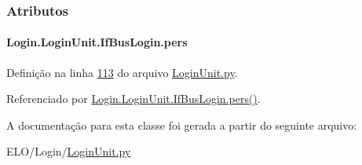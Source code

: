 \subsubsection{Atributos}
\hypertarget{classLogin_1_1LoginUnit_1_1IfBusLogin_a53b8075436052b94282021c84a2c3211}{
\paragraph[{pers}]{\setlength{\rightskip}{0pt plus 5cm}Login.\-Login\-Unit.\-If\-Bus\-Login.\-pers}}\label{classLogin_1_1LoginUnit_1_1IfBusLogin_a53b8075436052b94282021c84a2c3211}


Definição na linha \hyperlink{LoginUnit_8py_source_l00113}{113} do arquivo \hyperlink{LoginUnit_8py_source}{Login\-Unit.\-py}.



Referenciado por \hyperlink{classLogin_1_1LoginUnit_1_1IfBusLogin_a807b0a5d5bdae58087feb9d810a6538d}{Login.\-Login\-Unit.\-If\-Bus\-Login.\-pers()}.



A documentação para esta classe foi gerada a partir do seguinte arquivo\-:\begin{DoxyCompactItemize}
\item 
E\-L\-O/\-Login/\hyperlink{LoginUnit_8py}{Login\-Unit.\-py}\end{DoxyCompactItemize}

